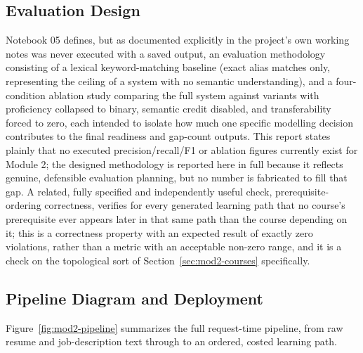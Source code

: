 \documentclass[11pt,a4paper]{article}
\begin{document}
\subsection{Evaluation Design}

Notebook 05 defines, but as documented explicitly in the project's own working notes was never executed with a saved output, an evaluation methodology consisting of a lexical keyword-matching baseline (exact alias matches only, representing the ceiling of a system with no semantic understanding), and a four-condition ablation study comparing the full system against variants with proficiency collapsed to binary, semantic credit disabled, and transferability forced to zero, each intended to isolate how much one specific modelling decision contributes to the final readiness and gap-count outputs. This report states plainly that no executed precision/recall/F1 or ablation figures currently exist for Module 2; the designed methodology is reported here in full because it reflects genuine, defensible evaluation planning, but no number is fabricated to fill that gap. A related, fully specified and independently useful check, prerequisite-ordering correctness, verifies for every generated learning path that no course's prerequisite ever appears later in that same path than the course depending on it; this is a correctness property with an expected result of exactly zero violations, rather than a metric with an acceptable non-zero range, and it is a check on the topological sort of Section~\ref{sec:mod2-courses} specifically.

\subsection{Pipeline Diagram and Deployment}
\label{sec:mod2-pipeline}

Figure~\ref{fig:mod2-pipeline} summarizes the full request-time pipeline, from raw resume and job-description text through to an ordered, costed learning path.
\end{document}
